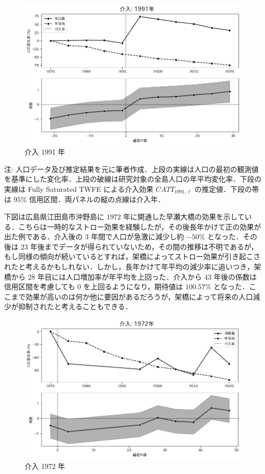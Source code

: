 \begin{figure}
\centering
\includegraphics{../figures/fully_saturated_twfe/1991.png}
\caption{介入 1991 年}
\end{figure}

注:
人口データ及び推定結果を元に筆者作成．上段の実線は人口の最初の観測値を基準にした変化率．上段の破線は研究対象の全島人口の年平均変化率．下段の実線は
Fully Saturated TWFE による介入効果 \(CATT_{1991, \ell}\)
の推定値．下段の帯は \(95\%\) 信用区間．両パネルの縦の点線は介入年．

下図は広島県江田島市沖野島に \(1972\)
年に開通した早瀬大橋の効果を示している．こちらは一時的なストロー効果を経験したが，その後長年かけて正の効果が出た例である．介入後の
\(3\) 年間で人口が急激に減少し約 \(-50\%\) となった．その後は \(23\)
年後までデータが得られていないため，その間の推移は不明であるが，もし同様の傾向が続いているとすれば，架橋によってストロー効果が引き起こされたと考えるかもしれない．しかし，長年かけて年平均の減少率に追いつき，架橋から
\(28\) 年目には人口増加率が年平均を上回った．介入から \(43\)
年後の係数は信用区間を考慮しても \(0\) を上回るようになり，期待値は
\(100.57\%\)
となった．ここまで効果が高いのは何か他に要因があるだろうが，架橋によって将来の人口減少が抑制されたと考えることもできる．

\begin{figure}
\centering
\includegraphics{../figures/fully_saturated_twfe/1972.png}
\caption{介入 1972 年}
\end{figure}

